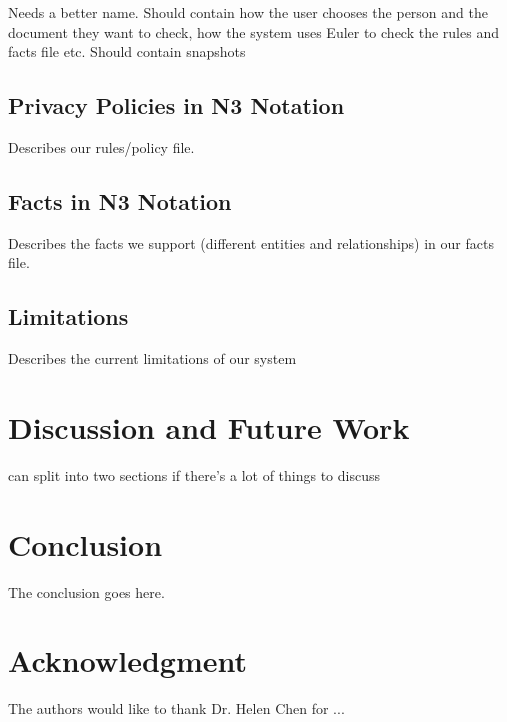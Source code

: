 \documentclass[conference]{IEEEtran}
\begin{document}
Needs a better name. Should contain how the user chooses the person and the document they want to check, how the system uses Euler to check the rules and facts file etc. Should contain snapshots

\subsection{Privacy Policies in N3 Notation}
\label{rules-sec}

Describes our rules/policy file. 

\subsection{Facts in N3 Notation}

Describes the facts we support (different entities and relationships) in our facts file.

\subsection{Limitations}

Describes the current limitations of our system

\section{Discussion and Future Work}
\label{discFuture}

can split into two sections if there's a lot of things to discuss


\section{Conclusion}
\label{concl}
The conclusion goes here.






\section*{Acknowledgment}


The authors would like to thank Dr. Helen Chen for ...











\end{document}
